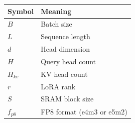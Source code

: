 \begin{table}[H]
\centering
\small
\begin{tabular}{ll}
\toprule
\textbf{Symbol} & \textbf{Meaning} \\
\midrule
$B$ & Batch size \\
$L$ & Sequence length \\
$d$ & Head dimension \\
$H$ & Query head count \\
$H_{kv}$ & KV head count \\
$r$ & LoRA rank \\
$S$ & SRAM block size \\
$f_{p8}$ & FP8 format (e4m3 or e5m2) \\
\bottomrule
\end{tabular}
\end{table}

